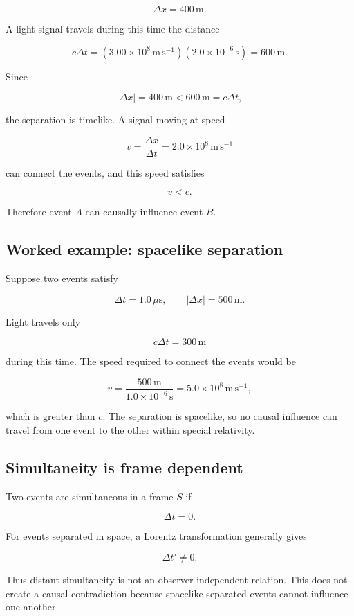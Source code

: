 \[
\Delta x=400\,\mathrm{m}.
\]

A light signal travels during this time the distance

\[
c\Delta t
=
(3.00\times10^{8}\,\mathrm{m\,s^{-1}})
(2.0\times10^{-6}\,\mathrm{s})
=
600\,\mathrm{m}.
\]

Since

\[
|\Delta x|=400\,\mathrm{m}<600\,\mathrm{m}=c\Delta t,
\]

the separation is timelike. A signal moving at speed

\[
v
=
\frac{\Delta x}{\Delta t}
=
2.0\times10^{8}\,\mathrm{m\,s^{-1}}
\]

can connect the events, and this speed satisfies

\[
v<c.
\]

Therefore event \(A\) can causally influence event \(B\).

\subsection{Worked example: spacelike separation}

Suppose two events satisfy

\[
\Delta t=1.0\,\mu\mathrm{s},
\qquad
|\Delta x|=500\,\mathrm{m}.
\]

Light travels only

\[
c\Delta t
=
300\,\mathrm{m}
\]

during this time. The speed required to connect the events would be

\[
v
=
\frac{500\,\mathrm{m}}{1.0\times10^{-6}\,\mathrm{s}}
=
5.0\times10^{8}\,\mathrm{m\,s^{-1}},
\]

which is greater than \(c\). The separation is spacelike, so no causal influence can travel from one event to the other within special relativity.

\subsection{Simultaneity is frame dependent}

Two events are simultaneous in a frame \(S\) if

\[
\Delta t=0.
\]

For events separated in space, a Lorentz transformation generally gives

\[
\Delta t'\neq0.
\]

Thus distant simultaneity is not an observer-independent relation. This does not create a causal contradiction because spacelike-separated events cannot influence one another.

